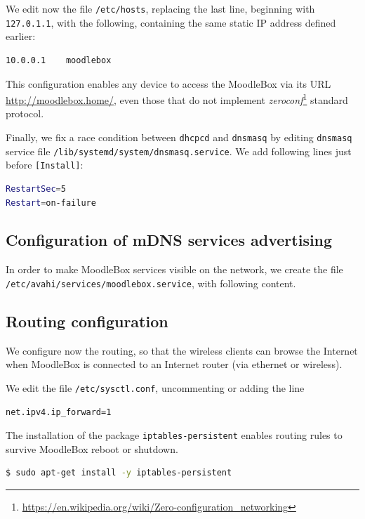 \documentclass[12pt]{article}
\begin{document}


We edit now the file \lstinline{/etc/hosts}, replacing the last line, beginning with \lstinline{127.0.1.1}, with the following, containing the same static IP address defined earlier:
\begin{lstlisting}[language=bash]
10.0.0.1	moodlebox
\end{lstlisting}
This configuration enables any device to access the MoodleBox via its URL \url{http://moodlebox.home/}, even those that do not implement \emph{zeroconf}\footnote{\url{https://en.wikipedia.org/wiki/Zero-configuration_networking}} standard protocol.

Finally, we fix a race condition between \lstinline{dhcpcd} and \lstinline{dnsmasq} by editing \lstinline{dnsmasq} service file \lstinline{/lib/systemd/system/dnsmasq.service}.
We add following lines just before \lstinline{[Install]}:
\begin{lstlisting}[language=bash]
RestartSec=5
Restart=on-failure
\end{lstlisting}

\subsection{Configuration of mDNS services advertising}

In order to make MoodleBox services visible on the network, we create the file \lstinline{/etc/avahi/services/moodlebox.service}, with following content.


\subsection{Routing configuration}

We configure now the routing, so that the wireless clients can browse the Internet when MoodleBox is connected to an Internet router (via ethernet or wireless).

We edit the file \lstinline{/etc/sysctl.conf}, uncommenting or adding the line
\begin{lstlisting}[language=bash]
net.ipv4.ip_forward=1
\end{lstlisting}

The installation of the package \lstinline{iptables-persistent} enables routing rules to survive MoodleBox reboot or shutdown.
\begin{lstlisting}[language=bash]
$ sudo apt-get install -y iptables-persistent
\end{lstlisting}
\end{document}
